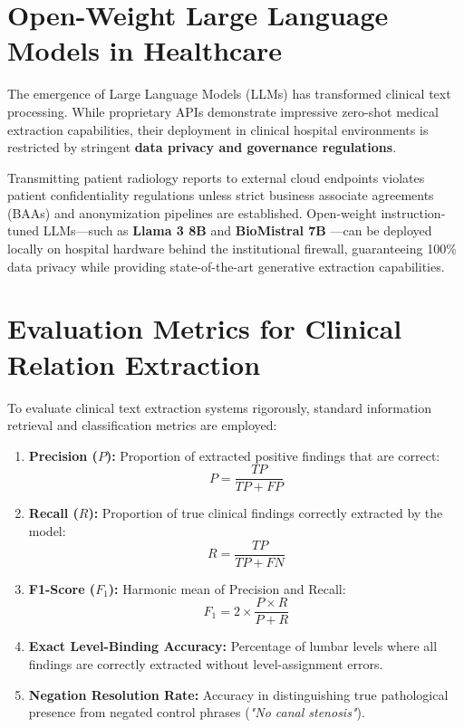\section{Open-Weight Large Language Models in Healthcare}
The emergence of Large Language Models (LLMs) has transformed clinical text processing. While proprietary APIs demonstrate impressive zero-shot medical extraction capabilities, their deployment in clinical hospital environments is restricted by stringent \textbf{data privacy and governance regulations}.

Transmitting patient radiology reports to external cloud endpoints violates patient confidentiality regulations unless strict business associate agreements (BAAs) and anonymization pipelines are established. Open-weight instruction-tuned LLMs---such as \textbf{Llama 3 8B} \cite{meta2024llama} and \textbf{BioMistral 7B} \cite{labrak2024biomistral}---can be deployed locally on hospital hardware behind the institutional firewall, guaranteeing 100\% data privacy while providing state-of-the-art generative extraction capabilities.

\section{Evaluation Metrics for Clinical Relation Extraction}
To evaluate clinical text extraction systems rigorously, standard information retrieval and classification metrics are employed:
\begin{enumerate}
    \item \textbf{Precision ($P$):} Proportion of extracted positive findings that are correct:
    \begin{equation}
        P = \frac{TP}{TP + FP}
    \end{equation}
    \item \textbf{Recall ($R$):} Proportion of true clinical findings correctly extracted by the model:
    \begin{equation}
        R = \frac{TP}{TP + FN}
    \end{equation}
    \item \textbf{F1-Score ($F_1$):} Harmonic mean of Precision and Recall:
    \begin{equation}
        F_1 = 2 \times \frac{P \times R}{P + R}
    \end{equation}
    \item \textbf{Exact Level-Binding Accuracy:} Percentage of lumbar levels where all findings are correctly extracted without level-assignment errors.
    \item \textbf{Negation Resolution Rate:} Accuracy in distinguishing true pathological presence from negated control phrases (\textit{"No canal stenosis"}).
\end{enumerate}

